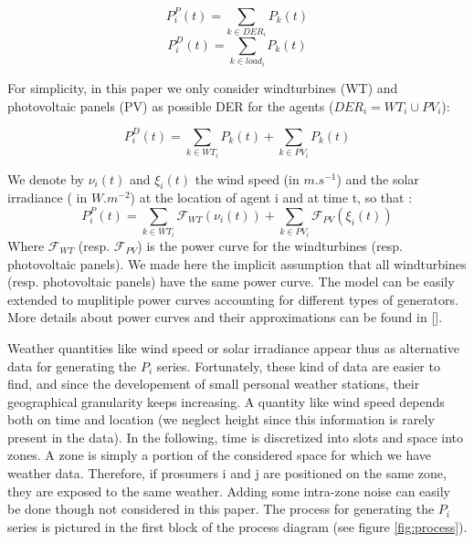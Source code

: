\documentclass[conference]{IEEEtran}
\begin{document}
\begin{equation}
P_{i}^{P}(t) = \sum_{k \in DER_{i}} P_{k}(t)
\end{equation}
\begin{equation}
P_{i}^{D}(t) = \sum_{k \in load_{i}} P_{k}(t)
\end{equation}

For simplicity, in this paper we only consider windturbines (WT) and photovoltaic panels (PV) as possible DER for the agents ($ DER_{i} = WT_{i} \cup PV_{i} $):  

\begin{equation}
P_{i}^{D}(t) = \sum_{k \in WT_{i}} P_{k}(t) + \sum_{k \in PV_{i}} P_{k}(t)
\end{equation} 

We denote by $ \nu_{i}(t) $ and $ \xi_{i}(t) $ the wind speed (in $ m.s^{-1} $) and the solar irradiance ( in $ W.m^{-2} $) at the location of agent i and at time t, so that :
\begin{equation}
 P_{i}^{P}(t) = \sum_{k \in WT_{i}} \mathcal{F}_{WT}( \nu_{i}(t) ) + \sum_{k \in PV_{i} } \mathcal{F}_{PV}(\xi_{i}(t) ) 
\end{equation}
Where $ \mathcal{F}_{WT} $ (resp. $ \mathcal{F}_{PV} $) is the power curve for the windturbines (resp. photovoltaic panels). We made here the implicit assumption that all windturbines (resp. photovoltaic panels) have the same power curve. The model can be easily extended to muplitiple power curves accounting for different types of generators. More details about power curves and their approximations can be found in []. 

Weather quantities like wind speed or solar irradiance appear thus as alternative data for generating the $ P_{i} $ series. Fortunately, these kind of data are easier to find, and since the developement of small personal weather stations, their geographical granularity keeps increasing.  A quantity like wind speed depends both on time and location (we neglect height since this information is rarely present in the data). In the following, time is discretized into slots and space into zones. A zone is simply a portion of the considered space for which we have weather data. Therefore, if prosumers i and j are positioned on the same zone, they are exposed to the same weather. Adding some intra-zone noise can easily be done though not considered in this paper. The process for generating the $ P_{i} $ series is pictured in the first block of the process diagram (see figure \ref{fig:process}).
\end{document}
